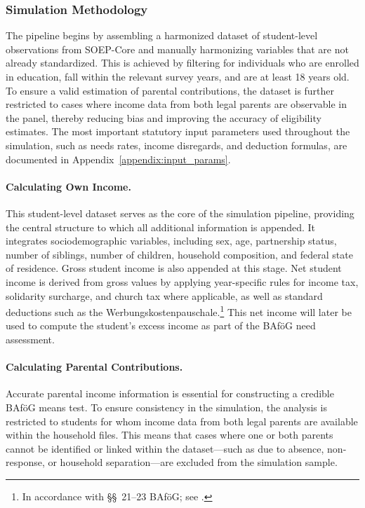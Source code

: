 
\subsubsection{Simulation Methodology}
The pipeline begins by assembling a harmonized dataset of student-level observations from SOEP-Core and manually harmonizing variables that are not already standardized. 
This is achieved by filtering for individuals who are enrolled in education, fall within the relevant survey years, and are at least 18 years old. 
To ensure a valid estimation of parental contributions, the dataset is further restricted to cases where income data from both legal parents are observable in the panel, thereby reducing bias and improving the accuracy of eligibility estimates. 
The most important statutory input parameters used throughout the simulation, such as needs rates, income disregards, and deduction formulas, are documented in Appendix~\ref{appendix:input_params}.

\paragraph{Calculating Own Income.} 
This student-level dataset serves as the core of the simulation pipeline, providing the central structure to which all additional information is appended. 
It integrates sociodemographic variables, including sex, age, partnership status, number of siblings, number of children, household composition, and federal state of residence. 
Gross student income is also appended at this stage. 
Net student income is derived from gross values by applying year-specific rules for income tax, solidarity surcharge, and church tax where applicable, as well as standard deductions such as the Werbungskostenpauschale.\footnote{In accordance with §§~21–23 BAföG; see \citet{bafoeg_law}.} 
This net income will later be used to compute the student’s excess income as part of the BAföG need assessment.

\paragraph{Calculating Parental Contributions.}
Accurate parental income information is essential for constructing a credible BAföG means test. 
To ensure consistency in the simulation, the analysis is restricted to students for whom income data from both legal parents are available within the household files. 
This means that cases where one or both parents cannot be identified or linked within the dataset—such as due to absence, non-response, or household separation—are excluded from the simulation sample.

